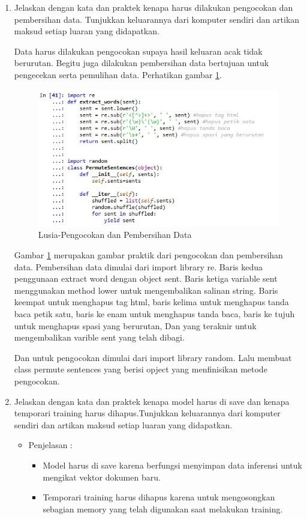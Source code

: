 \begin{enumerate}
\item Jelaskan dengan kata dan praktek kenapa harus dilakukan pengocokan dan pembersihan data. Tunjukkan keluarannya dari komputer sendiri dan artikan maksud setiap luaran yang didapatkan.
	\par Data harus dilakukan pengocokan supaya hasil keluaran acak tidak berurutan.  Begitu juga dilakukan pembersihan data bertujuan untuk pengecekan serta pemulihan data. Perhatikan gambar \ref{5b19}.
	\begin{figure}[!hbtp]
	\centering
	\includegraphics[scale=0.5]{figures/q5.jpg}
	\caption{Lusia-Pengocokan dan Pembersihan Data}
	\label{5b19}
	\end{figure}
	\par Gambar \ref{5b19} merupakan gambar praktik dari pengocokan dan pembersihan data. Pembersihan data dimulai dari import library re. Baris kedua penggunaan extract word dengan object sent. Baris ketiga variable sent menggunakan method lower untuk mengembalikan salinan string. Baris keempat untuk menghapus tag html, baris kelima untuk menghapus tanda baca petik satu, baris ke enam untuk menghapus tanda baca, baris ke tujuh untuk menghapus spasi yang berurutan, Dan yang teraknir untuk mengembalikan varible sent yang telah dibagi.
	\par Dan untuk pengocokan dimulai dari import library random. Lalu membuat class permute sentences yang berisi opject yang menfinisikan metode pengocokan.

\item Jelaskan dengan kata dan praktek kenapa model harus di save dan kenapa temporari training harus dihapus.Tunjukkan keluarannya dari komputer sendiri dan artikan maksud setiap luaran yang didapatkan.
	\begin{itemize}
	\item Penjelasan :
	\begin{itemize}
		\item Model harus di save karena berfungsi menyimpan data inferensi untuk mengikat vektor dokumen baru.
		\item Temporari training harus dihapus karena untuk mengosongkan sebagian memory yang telah digunakan saat melakukan training.
	\end{itemize}	  
	

\end{itemize}
\end{enumerate}
